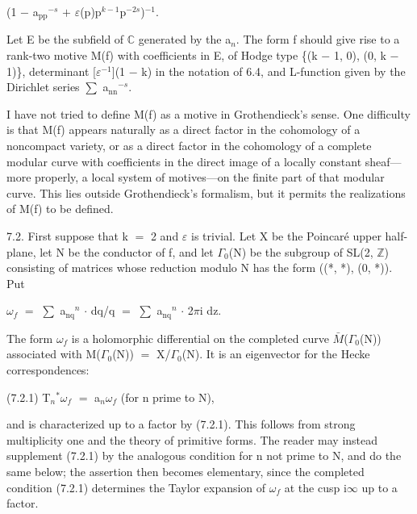 \documentclass[10pt,twoside]{article}
\begin{document}
(1 \ensuremath{−} a\ensuremath{_{\mathrm{pp}}}\ensuremath{^{-s}} \ensuremath{+} \ensuremath{ε}(p)p\ensuremath{^{k−1}}p\ensuremath{^{-2s}})\ensuremath{^{-1}}.\par
Let E be the subfield of \ensuremath{ℂ} generated by the a\ensuremath{_{n}}. The form f should give rise to a rank-two motive M(f) with coefficients in E, of Hodge type \{(k \ensuremath{−} 1, 0), (0, k \ensuremath{−} 1)\}, determinant [\ensuremath{ε}\ensuremath{^{-1}}](1 \ensuremath{−} k) in the notation of 6.4, and L-function given by the Dirichlet series \ensuremath{∑} a\ensuremath{_{\mathrm{nn}}}\ensuremath{^{-s}}.\par
I have not tried to define M(f) as a motive in Grothendieck’s sense. One difficulty is that M(f) appears naturally as a direct factor in the cohomology of a noncompact variety, or as a direct factor in the cohomology of a complete modular curve with coefficients in the direct image of a locally constant sheaf—more properly, a local system of motives—on the finite part of that modular curve. This lies outside Grothendieck’s formalism, but it permits the realizations of M(f) to be defined.\par
7.2. First suppose that k \ensuremath{=} 2 and \ensuremath{ε} is trivial. Let X be the Poincaré upper half-plane, let N be the conductor of f, and let \ensuremath{Γ}\ensuremath{_{0}}(N) be the subgroup of SL(2, \ensuremath{ℤ}) consisting of matrices whose reduction modulo N has the form ((*, *), (0, *)). Put\par
\ensuremath{ω}\ensuremath{_{f}} \ensuremath{=} \ensuremath{∑} a\ensuremath{_{\mathrm{nq}}}\ensuremath{^{n}} \ensuremath{·} dq/q \ensuremath{=} \ensuremath{∑} a\ensuremath{_{\mathrm{nq}}}\ensuremath{^{n}} \ensuremath{·} 2\ensuremath{π}i dz.\par
The form \ensuremath{ω}\ensuremath{_{f}} is a holomorphic differential on the completed curve \ensuremath{\bar{M}}(\ensuremath{Γ}\ensuremath{_{0}}(N)) associated with M(\ensuremath{Γ}\ensuremath{_{0}}(N)) \ensuremath{=} X/\ensuremath{Γ}\ensuremath{_{0}}(N). It is an eigenvector for the Hecke correspondences:\par
(7.2.1)    T\ensuremath{_{n}}\ensuremath{^{*}}\ensuremath{ω}\ensuremath{_{f}} \ensuremath{=} a\ensuremath{_{n}}\ensuremath{ω}\ensuremath{_{f}}    (for n prime to N),\par
and is characterized up to a factor by (7.2.1). This follows from strong multiplicity one and the theory of primitive forms. The reader may instead supplement (7.2.1) by the analogous condition for n not prime to N, and do the same below; the assertion then becomes elementary, since the completed condition (7.2.1) determines the Taylor expansion of \ensuremath{ω}\ensuremath{_{f}} at the cusp i\ensuremath{∞} up to a factor.\par
\end{document}
